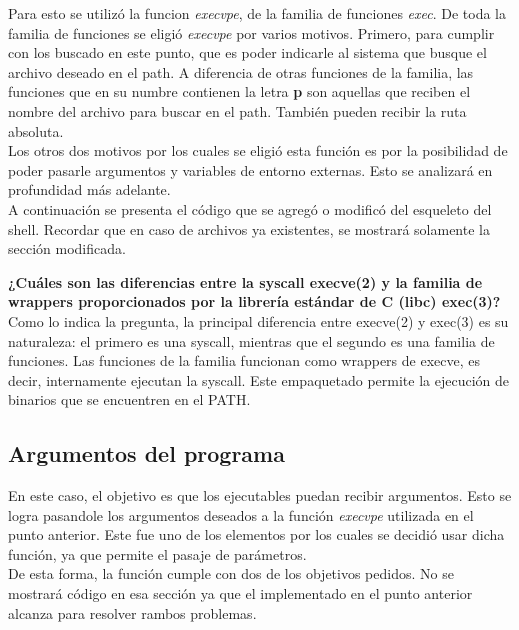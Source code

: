 \documentclass[a4paper, 12pt]{article}
\begin{document}
		Para esto se utilizó la funcion \textit{execvpe}, de la familia de funciones \textit{exec}. De toda la familia de funciones se eligió \textit{execvpe} por varios motivos. Primero, para cumplir con los buscado en este punto, que es poder indicarle al sistema que busque el archivo deseado en el path. A diferencia de otras funciones de la familia, las funciones que en su numbre contienen la letra \textbf{p} son aquellas que reciben el nombre del archivo para buscar en el path. También pueden recibir la ruta absoluta.\\
		
		Los otros dos motivos por los cuales se eligió esta función es por la posibilidad de poder pasarle argumentos y variables de entorno externas. Esto se analizará en profundidad más adelante.\\
		
		A continuación se presenta el código que se agregó o modificó del esqueleto del shell. Recordar que en caso de archivos ya existentes, se mostrará solamente la sección modificada.\\
		
		\bigskip\bigskip\bigskip
		
		
		\textbf{¿Cuáles son las diferencias entre la syscall execve(2) y la familia de wrappers proporcionados por la librería estándar de C (libc) exec(3)?} Como lo indica la pregunta, la principal diferencia entre execve(2) y exec(3) es su naturaleza: el primero es una syscall, mientras que el segundo es una familia de funciones. Las funciones de la familia funcionan como wrappers de execve, es decir, internamente ejecutan la syscall. Este empaquetado permite la ejecución de binarios que se encuentren en el PATH.
		
		\subsection{Argumentos del programa}
		En este caso, el objetivo es que los ejecutables puedan recibir argumentos. Esto se logra pasandole los argumentos deseados a la función \textit{execvpe} utilizada en el punto anterior. Este fue uno de los elementos por los cuales se decidió usar dicha función, ya que permite el pasaje de parámetros.\\
		
		De esta forma, la función cumple con dos de los objetivos pedidos. No se mostrará código en esa sección ya que el implementado en el punto anterior alcanza para resolver rambos problemas.\\
	
\end{document}
